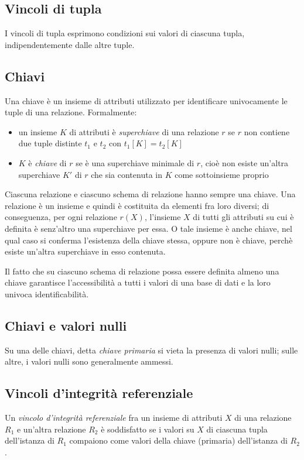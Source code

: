 \documentclass[11pt]{book}
\begin{document}
\subsection{Vincoli di tupla}
I vincoli di tupla esprimono condizioni sui valori di ciascuna tupla, indipendentemente dalle altre tuple.
\subsection{Chiavi}
Una chiave è un insieme di attributi utilizzato per identificare univocamente le tuple di una relazione.
Formalmente:
\begin{itemize}
    \item un insieme $K$ di attributi è \textit{superchiave} di una relazione $r$ se $r$ non contiene due tuple distinte 
    $t_1$ e $t_2$ con $t_1[K]=t_2[K]$
    \item $K$ è \textit{chiave} di $r$ se è una superchiave minimale di $r$, cioè non esiste un'altra superchiave $K'$ di 
    $r$ che sia contenuta in $K$ come sottoinsieme proprio
\end{itemize}
Ciascuna relazione e ciascuno schema di relazione hanno sempre una chiave. Una relazione è un insieme e quindi è costituita
da elementi fra loro diversi; di conseguenza, per ogni relazione $r(X)$, l'insieme $X$ di tutti gli attributi su cui è
definita è senz'altro una superchiave per essa. O tale insieme è anche chiave, nel qual caso si conferma l'esistenza della 
chiave stessa, oppure non è chiave, perchè esiste un'altra superchiave in esso contenuta.

Il fatto che su ciascuno schema di relazione possa essere definita almeno una chiave garantisce l'accessibilità a tutti 
i valori di una base di dati e la loro univoca identificabilità.
\subsection{Chiavi e valori nulli}
Su una delle chiavi, detta \textit{chiave primaria} si vieta la presenza di valori nulli; sulle altre, i valori nulli sono 
generalmente ammessi.
\subsection{Vincoli d'integrità referenziale}
Un \textit{vincolo d'integrità referenziale} fra un insieme di attributi $X$ di una relazione $R_1$ e un'altra relazione 
$R_2$ è soddisfatto se i valori su $X$ di ciascuna tupla dell'istanza di $R_1$ compaiono come valori della chiave (primaria)
dell'istanza di $R_2$.
\end{document}
